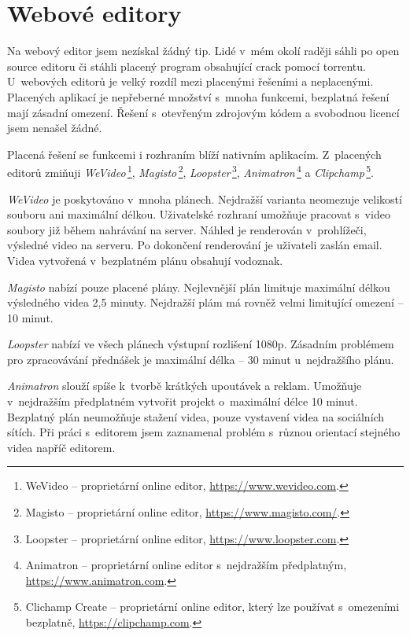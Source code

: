 \section{Webové editory}
Na webový editor jsem nezískal žádný tip. Lidé v~mém okolí raději sáhli po open source editoru či stáhli placený program obsahující crack pomocí torrentu. U~webových editorů je velký rozdíl mezi placenými řešeními a neplacenými. Placených aplikací je nepřeberné množství s~mnoha funkcemi, bezplatná řešení mají zásadní omezení. Řešení s~otevřeným zdrojovým kódem a svobodnou licencí jsem nenašel žádné.

Placená řešení se funkcemi i rozhraním blíží nativním aplikacím. Z~placených editorů zmiňuji \textit{WeVideo}\,\footnote{WeVideo --  proprietární online editor, \url{https://www.wevideo.com}.}, \textit{Magisto}\,\footnote{Magisto -- proprietární online editor, \url{https://www.magisto.com/}.}, \textit{Loopster}\,\footnote{Loopster -- proprietární online editor, \url{https://www.loopster.com}.}, \textit{Animatron}\,\footnote{Animatron -- proprietární online editor s~nejdražším předplatným, \url{https://www.animatron.com}.} a \textit{Clipchamp}\,\footnote{Clichamp Create -- proprietární online editor, který lze používat s~omezeními bezplatně, \url{https://clipchamp.com}.}.

\textit{WeVideo} je poskytováno v~mnoha plánech. Nejdražší varianta neomezuje velikostí souboru ani maximální délkou. Uživatelské rozhraní umožňuje pracovat s~video soubory již během nahrávání na server. Náhled je renderován v~prohlížeči, výsledné video na serveru. Po dokončení renderování je uživateli zaslán email. Videa vytvořená v~bezplatném plánu obsahují vodoznak.

\textit{Magisto} nabízí pouze placené plány. Nejlevnější plán limituje maximální délkou výsledného videa 2,5 minuty. Nejdražší plám má rovněž velmi limitující omezení -- 10 minut.

\textit{Loopster} nabízí ve všech plánech výstupní rozlišení 1080p. Zásadním problémem pro zpracovávání přednášek je maximální délka -- 30 minut u~nejdražšího plánu.

\textit{Animatron} slouží spíše k~tvorbě krátkých upoutávek a reklam. Umožňuje v~nejdražším předplatném vytvořit projekt o~maximální délce 10 minut. Bezplatný plán neumožňuje stažení videa, pouze vystavení videa na sociálních sítích. Při práci s~editorem jsem zaznamenal problém s~různou orientací stejného videa napříč editorem.

